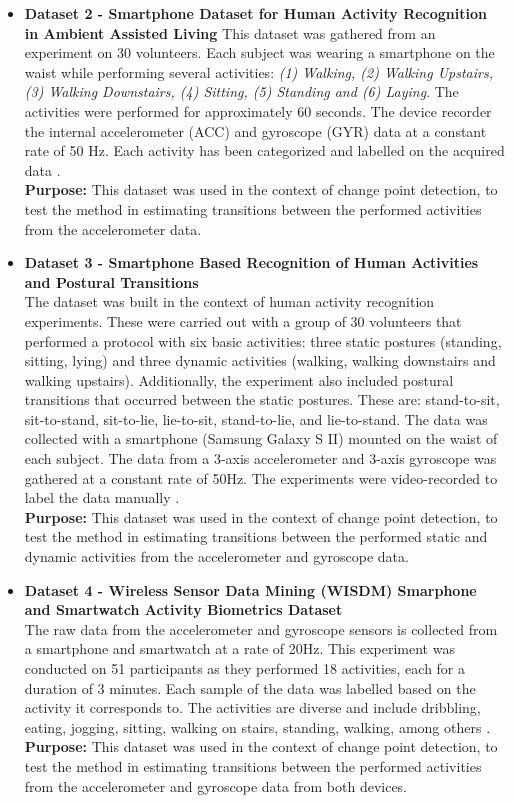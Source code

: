 \begin{itemize}
\item \textbf{Dataset 2 - Smartphone Dataset for Human Activity Recognition in Ambient Assisted Living} This dataset was gathered from an experiment on 30 volunteers. Each subject was wearing a smartphone on the waist while performing several activities: \textit{(1) Walking, (2) Walking Upstairs, (3) Walking Downstairs, (4) Sitting, (5) Standing and (6) Laying}. The activities were performed for approximately 60 seconds. The device recorder the internal accelerometer (ACC) and gyroscope (GYR) data at a constant rate of 50 Hz. Each activity has been categorized and labelled on the acquired data \cite{dataset2, dataset2_2}.\\
\textbf{Purpose:} This dataset was used in the context of change point detection, to test the method in estimating transitions between the performed activities from the accelerometer data.
    
\item \textbf{Dataset 3 - Smartphone Based Recognition of Human Activities and Postural Transitions}\\
The dataset was built in the context of human activity recognition experiments. These were carried out with a group of 30 volunteers that performed a protocol with six basic activities: three static postures (standing, sitting, lying) and three dynamic activities (walking, walking downstairs and walking upstairs). Additionally, the experiment also included postural transitions that occurred between the static postures. These are: stand-to-sit, sit-to-stand, sit-to-lie, lie-to-sit, stand-to-lie, and lie-to-stand. The data was collected with a smartphone (Samsung Galaxy S II) mounted on the waist of each subject. The data from a 3-axis accelerometer and 3-axis gyroscope was gathered at a constant rate of 50Hz. The experiments were video-recorded to label the data manually \cite{dataset3}.\\
\textbf{Purpose:} This dataset was used in the context of change point detection, to test the method in estimating transitions between the performed static and dynamic activities from the accelerometer and gyroscope data.

    
\item \textbf{Dataset 4 - Wireless Sensor Data Mining (WISDM) Smarphone and Smartwatch Activity Biometrics Dataset}\\
The raw data from the accelerometer and gyroscope sensors is collected from a smartphone and smartwatch at a rate of 20Hz. This experiment was conducted on 51 participants as they performed 18 activities, each for a duration of 3 minutes. Each sample of the data was labelled based on the activity it corresponds to. The activities are diverse and include dribbling, eating, jogging, sitting, walking on stairs, standing, walking, among others \cite{dataset4}.\\
\textbf{Purpose:} This dataset was used in the context of change point detection, to test the method in estimating transitions between the performed activities from the accelerometer and gyroscope data from both devices.
    

\end{itemize}
